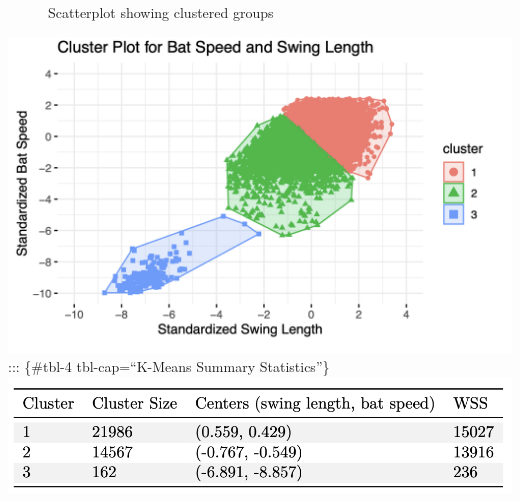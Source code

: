 \documentclass[
  letterpaper,
  DIV=11,
  numbers=noendperiod]{scrartcl}
\begin{document}
\begin{figure}[H]


\caption{\label{fig-cluster}Scatterplot showing clustered groups}

\end{figure}%

\includegraphics{./images/figures/fig5.png} ::: \{\#tbl-4
tbl-cap=``K-Means Summary Statistics''\}
\includegraphics{./images/tables/tbl4.png}
\end{document}
